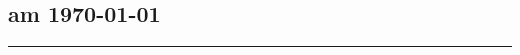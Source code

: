 	\begin{minipage}[c]{0.66\textwidth}

	\end{minipage}
	\begin{minipage}[c]{0.33\textwidth}
		\subsection*{am \today}
	\end{minipage}
	\rule{\textwidth}{1pt}
%
